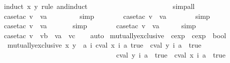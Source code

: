 \begin{isabellebody}
%
\isatagproof
{}\isamarkupfalse%
\ {\isacharparenleft}induct\ x\ y\ rule{\isacharcolon}\ and{\isachardot}induct{\isacharparenright}\isanewline
\ \ \ \ \ \ \ \ \ \ \ \ \ \ \ \ \ \ \ \ \ \ \isamarkupfalse%
\ simp{\isacharunderscore}all\isanewline
\ \ \ \ \ \ \isamarkupfalse%
\ {\isacharparenleft}case{\isacharunderscore}tac\ {\isachardoublequoteopen}v\ {\isacharequal}\ va{\isachardoublequoteclose}{\isacharparenright}\isanewline
\ \ \ \ \ \ \ \isamarkupfalse%
\ simp{\isacharplus}\isanewline
\ \ \ \ \ \ \isamarkupfalse%
\ {\isacharparenleft}case{\isacharunderscore}tac\ {\isachardoublequoteopen}v\ {\isacharequal}\ va{\isachardoublequoteclose}{\isacharparenright}\isanewline
\ \ \ \ \ \ \isamarkupfalse%
\ simp{\isacharplus}\isanewline
\ \ \ \ \ \ \isamarkupfalse%
\ {\isacharparenleft}case{\isacharunderscore}tac\ {\isachardoublequoteopen}v\ {\isacharequal}\ va{\isachardoublequoteclose}{\isacharparenright}\isanewline
\ \ \ \ \ \isamarkupfalse%
\ simp{\isacharplus}\isanewline
\ \ \ \ \ \ \isamarkupfalse%
\ {\isacharparenleft}case{\isacharunderscore}tac\ {\isachardoublequoteopen}v\ {\isacharequal}\ va{\isachardoublequoteclose}{\isacharparenright}\isanewline
\ \ \ \ \isamarkupfalse%
\ simp{\isacharplus}\isanewline
\ \ \isamarkupfalse%
\ {\isacharparenleft}case{\isacharunderscore}tac\ {\isachardoublequoteopen}v\ {\isacharequal}\ vb\ {\isasymand}\ va\ {\isacharequal}\ vc{\isachardoublequoteclose}{\isacharparenright}\isanewline
\ \ \isamarkupfalse%
\ auto%
\endisatagproof
{\isafoldproof}%
%
\isadelimproof
\isanewline
%
\endisadelimproof
\isanewline
{}\isamarkupfalse%
\ mutually{\isacharunderscore}exclusive\ {\isacharcolon}{\isacharcolon}\ {\isachardoublequoteopen}cexp\ {\isasymRightarrow}\ cexp\ {\isasymRightarrow}\ bool{\isachardoublequoteclose}\ \isanewline
\ \ {\isachardoublequoteopen}mutually{\isacharunderscore}exclusive\ x\ y\ {\isacharequal}\ {\isacharparenleft}{\isasymforall}a\ i{\isachardot}\ {\isacharparenleft}cval\ x\ i\ a{\isacharequal}\ true\ {\isasymlongrightarrow}\ cval\ y\ i\ a\ {\isasymnoteq}\ true{\isacharparenright}\ {\isasymand}\isanewline
\ \ \ \ \ \ \ \ \ \ \ \ \ \ \ \ \ \ \ \ \ \ \ \ \ \ \ \ \ \ \ \ \ {\isacharparenleft}cval\ y\ i\ a\ {\isacharequal}\ true\ {\isasymlongrightarrow}\ cval\ x\ i\ a\ {\isasymnoteq}\ true{\isacharparenright}{\isacharparenright}{\isachardoublequoteclose}\isanewline
\isanewline

\end{isabellebody}
